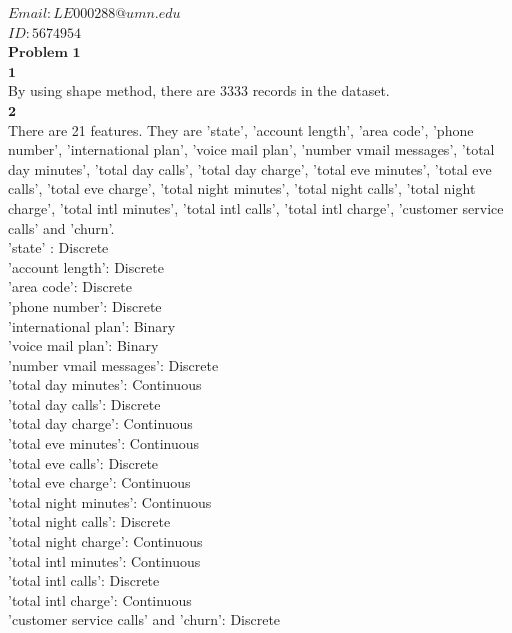 \documentclass[12pt]{article}
\begin{document}
$Email: LE000288@umn.edu$\\

$ID:5674954$\\

$\textbf{Problem 1}$\\

$\textbf{1}$\\

By using shape method, there are 3333 records in the dataset.\\

$\textbf{2}$\\

There are 21 features. They are 'state', 'account length', 'area code', 'phone number', 'international plan', 'voice mail plan', 'number vmail messages', 'total day minutes', 'total day calls', 'total day charge', 'total eve minutes', 'total eve calls', 'total eve charge', 'total night minutes', 'total night calls', 'total night charge', 'total intl minutes', 'total intl calls', 'total intl charge', 'customer service calls' and 'churn'.\\

'state' : Discrete\\
'account length': Discrete\\
'area code': Discrete\\
'phone number': Discrete\\
'international plan': Binary\\
'voice mail plan': Binary\\
'number vmail messages': Discrete\\
'total day minutes': Continuous\\
'total day calls': Discrete\\
'total day charge': Continuous\\
'total eve minutes': Continuous\\
'total eve calls': Discrete\\
'total eve charge': Continuous\\
'total night minutes': Continuous\\
'total night calls': Discrete\\
'total night charge': Continuous\\
'total intl minutes': Continuous\\
'total intl calls': Discrete\\
'total intl charge': Continuous\\
'customer service calls' and 'churn': Discrete\\
\end{document}
